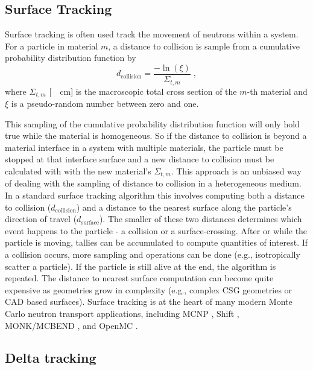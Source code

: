 \subsection{Surface Tracking}
\label{c5:surface_tracking}

Surface tracking is often used track the movement of neutrons within a system. 
For a particle in material $m$, a distance to collision is sample from a cumulative probability distribution function by
\begin{equation}
    d_{\text{collision}} = \frac{-\ln(\xi)}{\Sigma_{t,m}} \; ,
\end{equation}
where $\Sigma_{t,m}$ [\SI{}{\per\centi\meter}] is the macroscopic total cross section of the $m$-th material and $\xi$ is a pseudo-random number between zero and one.

This sampling of the cumulative probability distribution function will only hold true while the material is homogeneous.
So if the distance to collision is beyond a material interface in a system with multiple materials, the particle must be stopped at that interface surface and a new distance to collision must be calculated with with the new material's $\Sigma_{t,m}$.
This approach is an unbiased way of dealing with the sampling of distance to collision in a heterogeneous medium.
In a standard surface tracking algorithm this involves computing both a distance to collision ($d_{\text{collision}}$) and a distance to the nearest surface along the particle's direction of travel ($d_{\text{surface}}$).
The smaller of these two distances determines which event happens to the particle - a collision or a surface-crossing.
After or while the particle is moving, tallies can be accumulated to compute quantities of interest.
If a collision occurs, more sampling and operations can be done (e.g., isotropically scatter a particle).
If the particle is still alive at the end, the algorithm is repeated.
The distance to nearest surface computation can become quite expensive as geometries grow in complexity (e.g., complex CSG geometries or CAD based surfaces).
Surface tracking is at the heart of many modern Monte Carlo neutron transport applications, including MCNP \cite{MCNP_RisingArmstrongEtAl}, Shift \cite{hamilton_continuous-energy_2019, pandya_implementation_2016}, MONK/MCBEND \cite{richards_monk_2015}, and OpenMC \cite{romano_openmc_2015}.

\subsection{Delta tracking}
\label{c5:delta_tracking}

